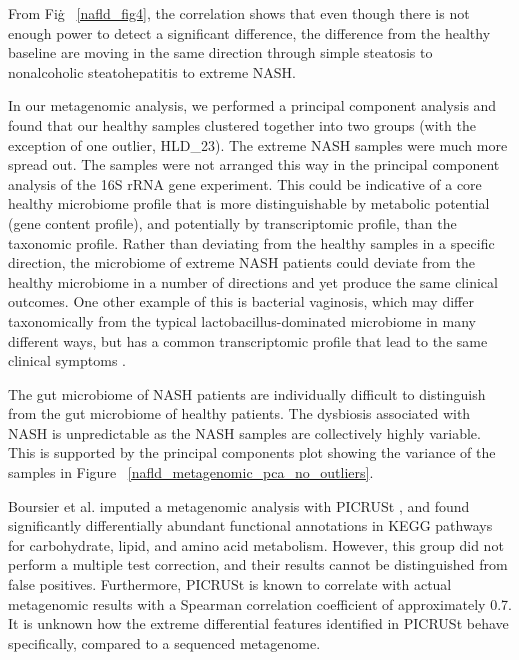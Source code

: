From Fig\. ~\ref{nafld_fig4}, the correlation shows that even though there is not enough power to detect a significant difference, the difference from the healthy baseline are moving in the same direction through simple steatosis to nonalcoholic steatohepatitis to extreme NASH.

In our metagenomic analysis, we performed a principal component analysis and found that our healthy samples clustered together into two groups (with the exception of one outlier, HLD\_23). The extreme NASH samples were much more spread out. The samples were not arranged this way in the principal component analysis of the 16S rRNA gene experiment. This could be indicative of a core healthy microbiome profile that is more distinguishable by metabolic potential (gene content profile), and potentially by transcriptomic profile, than the taxonomic profile. Rather than deviating from the healthy samples in a specific direction, the microbiome of extreme NASH patients could deviate from the healthy microbiome in a number of directions and yet produce the same clinical outcomes. One other example of this is bacterial vaginosis, which may differ taxonomically from the typical lactobacillus-dominated microbiome in many different ways, but has a common transcriptomic profile that lead to the same clinical symptoms \cite{macklaim2013comparative}.

The gut microbiome of NASH patients are individually difficult to distinguish from the gut microbiome of healthy patients. The dysbiosis associated with NASH is unpredictable as the NASH samples are collectively highly variable. This is supported by the principal components plot showing the variance of the samples in Figure ~\ref{nafld_metagenomic_pca_no_outliers}.

Boursier et al. \cite{boursier2016severity} imputed a metagenomic analysis with PICRUSt \cite{langille2013predictive}, and found significantly differentially abundant functional annotations in KEGG pathways for carbohydrate, lipid, and amino acid metabolism. However, this group did not perform a multiple test correction, and their results cannot be distinguished from false positives. Furthermore, PICRUSt is known to correlate with actual metagenomic results with a Spearman correlation coefficient of approximately 0.7. It is unknown how the extreme differential features identified in PICRUSt behave specifically, compared to a sequenced metagenome.

